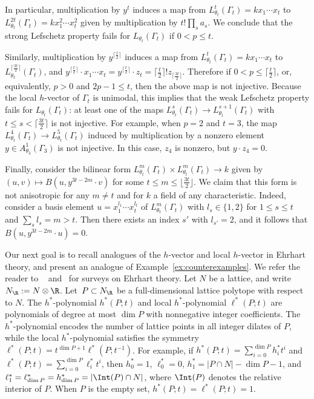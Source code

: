 \begin{example}
In particular, 
multiplication by $y^t$ induces a map from $L^t_{\theta_t}(\Gamma_t) = k x_1\cdots x_t$ to  $L^{2t}_{\theta_t}(\Gamma_t) = k x_1^2\cdots x_t^2$ given by multiplication by $t! \prod_s a_s$. We conclude that the strong Lefschetz property fails for  $L_{\theta_t}(\Gamma_t)$ if $0 < p \le t$. 

Similarly, multiplication by $y^{\lceil \frac{t}{2} \rceil}$ induces a map from $L^t_{\theta_t}(\Gamma_t) = k x_1\cdots x_t$ to  $L^{\lceil \frac{3t}{2} \rceil}_{\theta_t}(\Gamma_t)$, and 
$y^{\lceil \frac{t}{2} \rceil} \cdot x_1\cdots x_t = y^{\lceil \frac{t}{2} \rceil} \cdot z_t = \lceil \frac{t}{2} \rceil! z_{\lceil \frac{3t}{2} \rceil}$. Therefore if $0 < p \le \lceil \frac{t}{2} \rceil$, or, equivalently, $p > 0$ and $2p - 1 \le t$, then the above map is not injective. Because the local $h$-vector of $\Gamma_{t}$ is unimodal, this implies that the weak Lefschetz property fails for  $L_{\theta_t}(\Gamma_t)$: at least one of the maps $L_{\theta_t}^{s}(\Gamma_t) \to L_{\theta_t}^{s+1}(\Gamma_t)$ with $t \le s < \lceil \frac{3t}{2} \rceil$ is not injective. For example, when $p = 2$ and $t = 3$, the map $L^4_{\theta_t}(\Gamma_t) \to L^5_{\theta_t}(\Gamma_t)$ induced by multiplication by a nonzero element $y \in A_{\theta_3}^1(\Gamma_3)$ is not injective. In this case, $z_4$ is nonzero, but $y \cdot z_4 = 0$. 

Finally, consider the bilinear form  $L_{\theta_t}^m(\Gamma_t) \times L_{\theta_t}^m(\Gamma_t)  \to k$ given by $(u, v) \mapsto B(u, y^{3t-2m} \cdot v)$ for some $t \le m \le \lfloor \frac{3t}{2} \rfloor$. We claim that this form is not anisotropic for any $m \neq t$ and for $k$ a field of any characteristic. Indeed, consider a basis element $u = x_1^{l_1}\cdots x_t^{l_t}$ of $L_{\theta_t}^m(\Gamma_t)$ with  $l_s \in \{ 1,2 \}$ for  $1 \le s \le t$ and $\sum_s l_s = m > t$. Then there exists an index $s'$ with $l_{s'} = 2$, and it follows that $B(u, y^{3t-2m} \cdot u) = 0$. 
\end{example}

Our next goal is to recall analogues of the $h$-vector and local $h$-vector in Ehrhart theory, and present an analogue of Example~\ref{ex:counterexamples}. We refer the reader to ~\cite{BarvinokIntegerPolyhedra} and~\cite{BeckRobinsComputing}  for surveys on Ehrhart theory. 
Let $N$ be a lattice, and write $N_\R := N \otimes \R$. 
Let~$P \subset N_\R$ be a full-dimensional lattice polytope with respect to $N$. The $h^*$-polynomial $h^*(P;t)$ and local $h^*$-polynomial $\ell^*(P;t)$  are polynomials of degree at most $\dim P$ with nonnegative integer coefficients. The $h^*$-polynomial
encodes the number of lattice points in all integer dilates of $P$, while the local $h^*$-polynomial satisfies 
the symmetry 
$\ell^*(P;t) = t^{\dim P + 1}\ell^*(P;t^{-1})$. 
For example, if $h^*(P;t) = \sum_{i = 0}^{\dim P} h^*_i t^i$ and $\ell^*(P;t) = \sum_{i = 0}^{\dim P} \ell^*_i t^i$, then $h_0^* = 1$, $\ell_0^* = 0$,  $h_1^* = |P \cap N| - \dim P - 1$, and $\ell_1^* = \ell_{\dim P}^* =  h_{\dim P}^* =  |\Int(P) \cap N|$, where $\Int(P)$ denotes the relative interior of $P$.
When $P$ is the empty set,  $h^*(P;t) = \ell^*(P;t) = 1$.

